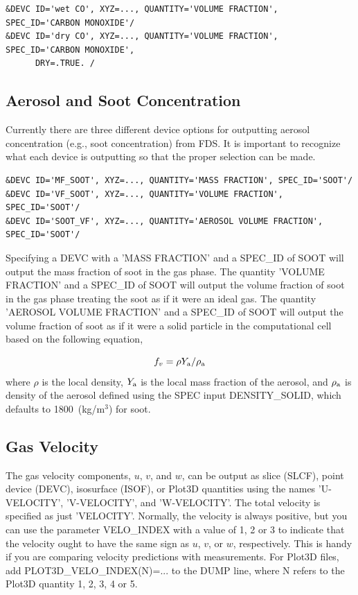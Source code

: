 \documentclass[11pt]{book}
\begin{document}
\begin{lstlisting}
&DEVC ID='wet CO', XYZ=..., QUANTITY='VOLUME FRACTION', SPEC_ID='CARBON MONOXIDE'/
&DEVC ID='dry CO', XYZ=..., QUANTITY='VOLUME FRACTION', SPEC_ID='CARBON MONOXIDE',
      DRY=.TRUE. /
\end{lstlisting}

\subsection{Aerosol and Soot Concentration}
\label{info:soot}

Currently there are three different device options for outputting aerosol concentration (e.g., soot concentration) from FDS. It is important to recognize what each device is outputting so that the proper selection can be made.

\begin{lstlisting}
&DEVC ID='MF_SOOT', XYZ=..., QUANTITY='MASS FRACTION', SPEC_ID='SOOT'/
&DEVC ID='VF_SOOT', XYZ=..., QUANTITY='VOLUME FRACTION', SPEC_ID='SOOT'/
&DEVC ID='SOOT_VF', XYZ=..., QUANTITY='AEROSOL VOLUME FRACTION', SPEC_ID='SOOT'/
\end{lstlisting}

\noindent Specifying a {\ct DEVC} with a {\ct 'MASS FRACTION'} and a {\ct SPEC\_ID} of {\ct SOOT} will output the mass fraction of soot in the gas phase. The quantity {\ct 'VOLUME FRACTION'} and a {\ct SPEC\_ID} of {\ct SOOT} will output the volume fraction of soot in the gas phase treating the soot as if it were an ideal gas. The quantity {\ct 'AEROSOL VOLUME FRACTION'} and a {\ct SPEC\_ID} of {\ct SOOT} will output the volume fraction of soot as if it were a solid particle in the computational cell based on the following equation,

\begin{equation}\label{eq:soot_volume_fraction}
f_v = \rho Y_{\rm a} / \rho_{\rm a}
\end{equation}
\noindent where $\rho$ is the local density, $Y_{\rm a}$ is the local mass fraction of the aerosol, and $\rho_{\rm a}$ is density of the aerosol defined using the {\ct SPEC} input {\ct DENSITY\_SOLID}, which defaults to 1800~(kg/m$^3$) for soot.

\subsection{Gas Velocity}
\label{info:velocity}

The gas velocity components, $u$, $v$, and $w$, can be output as slice ({\ct SLCF}), point device ({\ct DEVC}), isosurface ({\ct ISOF}), or Plot3D quantities using
the names {\ct 'U-VELOCITY'}, {\ct 'V-VELOCITY'}, and {\ct 'W-VELOCITY'}.
The total velocity is specified as just {\ct 'VELOCITY'}. Normally, the velocity is always positive, but you can use the parameter {\ct VELO\_INDEX} with a value
of 1, 2 or 3 to indicate that the velocity ought to have the same sign as $u$, $v$, or $w$, respectively. This is handy if you are comparing velocity predictions
with measurements. For Plot3D files, add {\ct PLOT3D\_VELO\_INDEX(N)=...} to the {\ct DUMP} line, where {\ct N} refers to the Plot3D quantity 1, 2, 3, 4 or 5.
\end{document}
